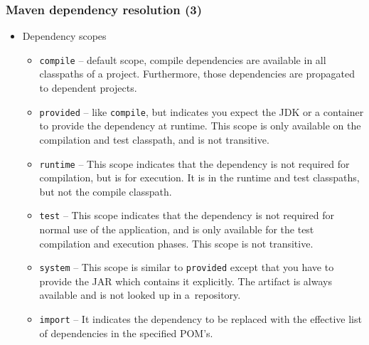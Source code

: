 \documentclass[10pt,xcolor=pdflatex]{beamer}
\begin{document}
\begin{frame}[containsverbatim]\frametitle{Maven dependency resolution (3)}
\begin{itemize}
    \item Dependency scopes
    \begin{itemize}
    	\item \texttt{compile} -- default scope, compile dependencies are available in all classpaths of a project. Furthermore, those dependencies are propagated to dependent projects.
        \item \texttt{provided} --  like \texttt{compile}, but indicates you expect the JDK or a container to provide the dependency at runtime. This scope is only available on the compilation and test classpath, and is not transitive.
        \item \texttt{runtime} -- This scope indicates that the dependency is not required for compilation, but is for execution. It is in the runtime and test classpaths, but not the compile classpath.
        \item \texttt{test} -- This scope indicates that the dependency is not required for normal use of the application, and is only available for the test compilation and execution phases. This scope is not transitive.
        \item \texttt{system} -- This scope is similar to \texttt{provided} except that you have to provide the JAR which contains it explicitly. The artifact is always available and is not looked up in a~repository.
        \item \texttt{import} -- It indicates the dependency to be replaced with the effective list of dependencies in the specified POM's.
    \end{itemize}
\end{itemize}
\end{frame}
\end{document}

